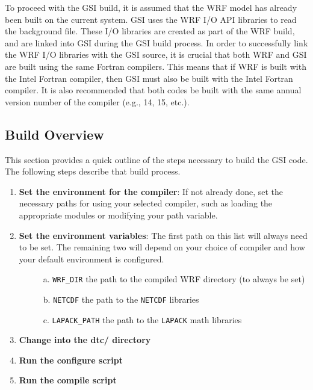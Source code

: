 To proceed with the GSI build, it is assumed that the WRF model has already been built on the current system. GSI uses the WRF I/O API libraries to read the background file. These I/O libraries are created as part of the WRF build, and are linked into GSI during the GSI build process. In order to successfully link the WRF I/O libraries with the GSI source, it is crucial that both WRF and GSI are built using the same Fortran compilers. This means that if WRF is built with the Intel Fortran compiler, then GSI must also be built with the Intel Fortran compiler. It is also recommended that both codes be built with the same annual version number of the compiler (e.g., 14, 15, etc.). 

\subsection{Build Overview} \label{ch2_compiling_overview}

This section provides a quick outline of the steps necessary to build the GSI code. The following steps describe that build process.

\begin{enumerate}
\item \textbf{Set the environment for the compiler}: If not already done, set the necessary paths for using your selected compiler, such as loading the appropriate modules or modifying your path variable.
\item \textbf{Set the environment variables}: The first path on this list will always need to be set. The remaining two will depend on your choice of compiler and how your default environment is configured.
\begin{description}
\item[]a. \verb|WRF_DIR| the path to the compiled WRF directory (to always be set) 
\item[]b. \verb|NETCDF| the path to the \verb|NETCDF| libraries
\item[]c. \verb|LAPACK_PATH| the path to the \verb|LAPACK| math libraries
\end{description}
\item \textbf{Change into the dtc/ directory}
\item \textbf{Run the configure script}
\item \textbf{Run the compile script}
\end{enumerate}

